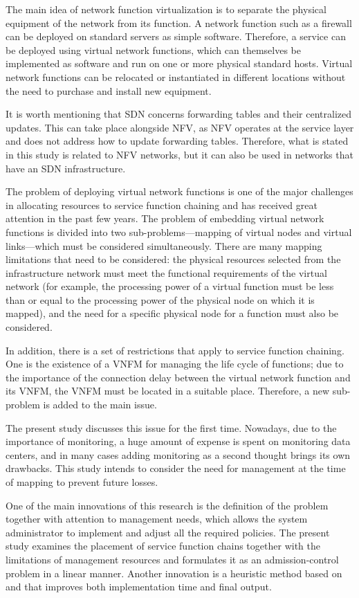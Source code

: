 The main idea of network function virtualization is to separate the physical
equipment of the network from its function. A network function such as a
firewall can be deployed on standard servers as simple software. Therefore, a
service can be deployed using virtual network functions, which can themselves be
implemented as software and run on one or more physical standard hosts. Virtual
network functions can be relocated or instantiated in different locations
without the need to purchase and install new equipment.

It is worth mentioning that SDN concerns forwarding tables and their centralized
updates. This can take place alongside NFV, as NFV operates at the service layer
and does not address how to update forwarding tables. Therefore, what is stated
in this study is related to NFV networks, but it can also be used in networks
that have an SDN infrastructure.

The problem of deploying virtual network functions is one of the major
challenges in allocating resources to service function chaining and has received
great attention in the past few years. The problem of embedding virtual network
functions is divided into two sub-problems---mapping of virtual nodes and
virtual links---which must be considered simultaneously. There are many mapping
limitations that need to be considered: the physical resources selected from the
infrastructure network must meet the functional requirements of the virtual
network (for example, the processing power of a virtual function must be less
than or equal to the processing power of the physical node on which it is
mapped), and the need for a specific physical node for a function must also be
considered.

In addition, there is a set of restrictions that apply to service function
chaining. One is the existence of a VNFM for managing the life cycle of
functions; due to the importance of the connection delay between the virtual
network function and its VNFM, the VNFM must be located in a suitable place.
Therefore, a new sub-problem is added to the main issue.

The present study discusses this issue for the first time. Nowadays, due to the
importance of monitoring, a huge amount of expense is spent on monitoring data
centers, and in many cases adding monitoring as a second thought brings its own
drawbacks. This study intends to consider the need for management at the time of
mapping to prevent future losses.

One of the main innovations of this research is the definition of the problem
together with attention to management needs, which allows the system
administrator to implement and adjust all the required policies. The present
study examines the placement of service function chains together with the
limitations of management resources and formulates it as an admission-control
problem in a linear manner. Another innovation is a heuristic method based on
\cite{Bari2015} and \cite{AbuLebdeh2017} that improves both implementation time
and final output.

